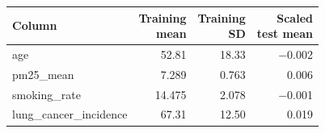 \begin{tabular}{lrrr}
\toprule
Column & \makecell[b]{Training\\{}mean} & \makecell[b]{Training\\{}SD} & \makecell[b]{Scaled\\{}test mean} \\
\midrule
age & 52.81 & 18.33 & $-$0.002 \\
pm25\_mean & 7.289 & 0.763 & 0.006 \\
smoking\_rate & 14.475 & 2.078 & $-$0.001 \\
lung\_cancer\_incidence & 67.31 & 12.50 & 0.019 \\
\bottomrule
\end{tabular}
